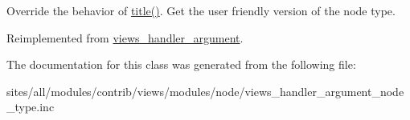 Override the behavior of \hyperlink{classviews__handler__argument__node__type_c17f7b9733895da68b132e6b97dcc917}{title()}. Get the user friendly version of the node type. 

Reimplemented from \hyperlink{classviews__handler__argument_76181ac24e7be4a09aaafc1fa5f15ea1}{views\_\-handler\_\-argument}.

The documentation for this class was generated from the following file:\begin{CompactItemize}
\item 
sites/all/modules/contrib/views/modules/node/views\_\-handler\_\-argument\_\-node\_\-type.inc\end{CompactItemize}

